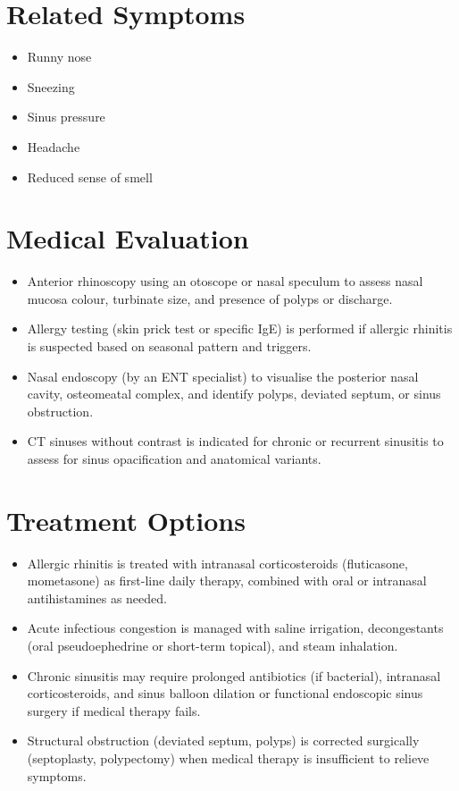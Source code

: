 \section*{Related Symptoms}
\begin{itemize}
  \item Runny nose
  \item Sneezing
  \item Sinus pressure
  \item Headache
  \item Reduced sense of smell
\end{itemize}

\section*{Medical Evaluation}
\begin{itemize}
  \item Anterior rhinoscopy using an otoscope or nasal speculum to assess nasal mucosa colour, turbinate size, and presence of polyps or discharge.
  \item Allergy testing (skin prick test or specific IgE) is performed if allergic rhinitis is suspected based on seasonal pattern and triggers.
  \item Nasal endoscopy (by an ENT specialist) to visualise the posterior nasal cavity, osteomeatal complex, and identify polyps, deviated septum, or sinus obstruction.
  \item CT sinuses without contrast is indicated for chronic or recurrent sinusitis to assess for sinus opacification and anatomical variants.
\end{itemize}

\section*{Treatment Options}
\begin{itemize}
  \item Allergic rhinitis is treated with intranasal corticosteroids (fluticasone, mometasone) as first-line daily therapy, combined with oral or intranasal antihistamines as needed.
  \item Acute infectious congestion is managed with saline irrigation, decongestants (oral pseudoephedrine or short-term topical), and steam inhalation.
  \item Chronic sinusitis may require prolonged antibiotics (if bacterial), intranasal corticosteroids, and sinus balloon dilation or functional endoscopic sinus surgery if medical therapy fails.
  \item Structural obstruction (deviated septum, polyps) is corrected surgically (septoplasty, polypectomy) when medical therapy is insufficient to relieve symptoms.
\end{itemize}

